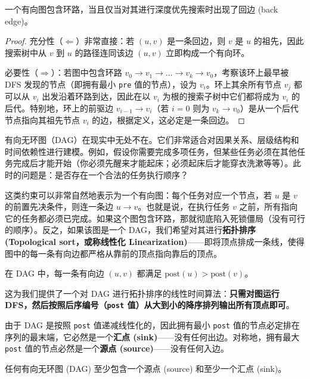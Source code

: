 \begin{property}
一个有向图包含环路，当且仅当对其进行深度优先搜索时出现了回边 (back edge)。
\end{property}

\begin{proof}
充分性（$\Leftarrow$）非常直接：若 $(u, v)$ 是一条回边，则 $v$ 是 $u$ 的祖先，因此搜索树中从 $v$ 到 $u$ 的路径连同该边 $(u, v)$ 立即构成一个有向环。

必要性（$\Rightarrow$）：若图中包含环路 $v_0 \to v_1 \to \dots \to v_k \to v_0$，考察该环上最早被 DFS 发现的节点（即拥有最小 \texttt{pre} 值的节点），设为 $v_i$。环上其余所有节点 $v_j$ 都可以从 $v_i$ 出发沿着环路到达，因此在以 $v_i$ 为根的搜索子树中它们都将成为 $v_i$ 的后代。特别地，环上的前驱边 $v_{i-1} \to v_i$（若 $i = 0$ 则为 $v_k \to v_0$）是从一个后代节点指向其祖先节点 $v_i$ 的边，根据定义，这必定是一条回边。
\end{proof}

有向无环图（DAG）在现实中无处不在。它们非常适合对因果关系、层级结构和时间依赖性进行建模。例如，假设你需要完成多项任务，但某些任务必须在其他任务完成后才能开始（你必须先醒来才能起床；必须起床后才能穿衣洗漱等等）。此时的问题是：是否存在一个合法的任务执行顺序？

这类约束可以非常自然地表示为一个有向图：每个任务对应一个节点，若 $u$ 是 $v$ 的前置先决条件，则连一条边 $u \to v$。也就是说，在执行任务 $v$ 之前，所有指向它的任务都必须已完成。如果这个图包含环路，那就彻底陷入死锁僵局（没有可行的顺序）。反之，如果该图是一个 DAG，我们希望对其进行\textbf{拓扑排序 (Topological sort，或称线性化 Linearization)}——即将顶点排成一条线，使得图中的每一条有向边都严格从靠前的顶点指向靠后的顶点。

\begin{property}
在 DAG 中，每一条有向边 $(u, v)$ 都满足 $\text{post}(u) > \text{post}(v)$。
\end{property}

这为我们提供了一个对 DAG 进行拓扑排序的线性时间算法：\textbf{只需对图运行 DFS，然后按照后序编号（\texttt{post} 值）从大到小的降序排列输出所有顶点即可}。

由于 DAG 是按照 \texttt{post} 值递减线性化的，因此拥有最小 \texttt{post} 值的节点必定排在序列的最末端，它必然是一个\textbf{汇点 (sink)}——没有任何出边。对称地，拥有最大 \texttt{post} 值的节点必然是一个\textbf{源点 (source)}——没有任何入边。

\begin{property}
任何有向无环图 (DAG) 至少包含一个源点 (source) 和至少一个汇点 (sink)。
\end{property}

